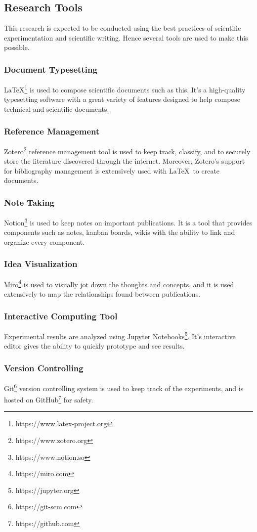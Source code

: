 \documentclass[../main.tex]{subfiles}
\begin{document}
\subsection{Research Tools}

This research is expected to be conducted using the best practices of scientific experimentation and scientific writing. Hence several tools are used to make this possible.

\subsubsection{Document Typesetting}
\LaTeX\footnote{https://www.latex-project.org} is used to compose scientific documents such as this. It's a high-quality typesetting software with a great variety of features designed to help compose technical and scientific documents.

\subsubsection{Reference Management}
Zotero\footnote{https://www.zotero.org} reference management tool is used to keep track, classify, and to securely store the literature discovered through the internet. Moreover, Zotero's support for bibliography management is extensively used with \LaTeX\ to create documents.

\subsubsection{Note Taking}
Notion\footnote{https://www.notion.so} is used to keep notes on important publications. It is a tool that provides components such as notes, kanban boards, wikis with the ability to link and organize every component.

\subsubsection{Idea Visualization}
Miro\footnote{https://miro.com} is used to visually jot down the thoughts and concepts, and it is used extensively to map the relationships found between publications.

\subsubsection{Interactive Computing Tool}
Experimental results are analyzed using Jupyter Notebooks\footnote{https://jupyter.org}. It's interactive editor gives the ability to quickly prototype and see results.

\subsubsection{Version Controlling}
Git\footnote{https://git-scm.com} version controlling system is used to keep track of the experiments, and is hosted on GitHub\footnote{https://github.com} for safety.
\end{document}
